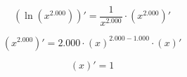 \documentclass[a4paper, 12pt]{article}
\begin{document}
\begin{dmath}
(\ln(x^{2.000}))'=\frac{1}{x^{2.000}}\cdot (x^{2.000})'\end{dmath}

\begin{dmath}
(x^{2.000})'=2.000\cdot(x)^{2.000-1.000}\cdot (x)'\end{dmath}

\begin{dmath}
(x)'=1\end{dmath}
\end{document}
